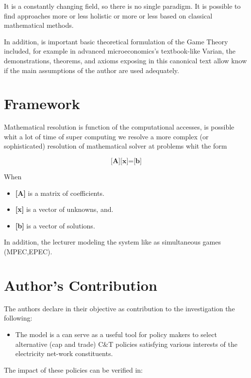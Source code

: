 \documentclass{article}
\begin{document}
It is a constantly changing field, so there is no single paradigm. It is possible to find approaches more or less holistic or more or less based on classical mathematical methods.

In addition, is important basic theoretical formulation of the Game Theory included, for example in advanced microeconomics's textbook-like Varian, the demonstrations, theorems, and axioms exposing in this canonical text allow know if the main assumptions of the author are used adequately.

\section{Framework}


Mathematical resolution is function of the computational accesses, is possible whit a lot of time of super computing we resolve a more complex (or sophisticated) resolution of mathematical solver at problems whit the form

\begin{equation}
\textbf{[A][x]=[b]}\label{it}   
\end{equation}

When
\begin{itemize}
    \item \textbf{[A]} is a matrix of coefficients.
    \item \textbf{[x]} is a vector of unknowns, and.
    \item \textbf{[b]} is a vector of solutions.
\end{itemize}

In addition, the lecturer modeling the system like as simultaneous games (MPEC,EPEC).

\section{Author's Contribution}

The authors declare in their objective as contribution to the investigation the following: 

\begin{itemize}
    \item The model is a can serve as a useful tool for policy makers to select alternative (cap and trade) C&T policies satisfying various interests of the electricity net-work constituents. 
\end{itemize}

The impact of these policies can be verified in:
\end{document}
